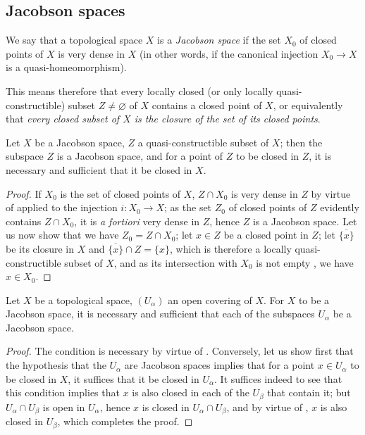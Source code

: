 \subsection{Jacobson spaces}
\label{subsection:IV.10.3}


\begin{definition}[10.3.1]
\label{IV.10.3.1}
We say that a topological space $X$ is a \emph{Jacobson space} if the set $X_0$ of closed points of $X$ is very dense in $X$ (in other words, if the canonical injection $X_0\to X$ is a quasi-homeomorphism).
\end{definition}

This means therefore  that every locally closed (or only locally quasi-constructible) subset $Z\neq\varnothing$ of $X$ contains a closed point of $X$, or equivalently that \emph{every closed subset of $X$ is the closure of the set of its closed points}.

\begin{proposition}[10.3.2]
\label{IV.10.3.2}
Let $X$ be a Jacobson space, $Z$ a quasi-constructible subset of $X$; then the subspace $Z$ is a Jacobson space, and for a point of $Z$ to be closed in $Z$, it is necessary and sufficient that it be closed in $X$.
\end{proposition}

\begin{proof}
If $X_0$ is the set of closed points of $X$, $Z\cap X_0$ is very dense in $Z$ by virtue of  applied to the injection $i:X_0\to X$; as the set $Z_0$ of closed points of $Z$ evidently contains $Z\cap X_0$, it is \emph{a fortiori} very dense in $Z$, hence $Z$ is a Jacobson space.
Let us now show that we have $Z_0=Z\cap X_0$; let $x\in Z$ be a closed point in $Z$; let $\overline{\{x\}}$ be its closure in $X$ and $\overline{\{x\}}\cap Z=\{x\}$, which is therefore a locally quasi-constructible subset of $X$, and as its intersection with $X_0$ is not empty , we have $x\in X_0$.
\end{proof}

\begin{proposition}[10.3.3]
\label{IV.10.3.3}
Let $X$ be a topological space, $(U_\alpha)$ an open covering of $X$.
For $X$ to be a Jacobson space, it is necessary and sufficient that each of the subspaces $U_\alpha$ be a Jacobson space.
\end{proposition}

\begin{proof}
The condition is necessary by virtue of .
Conversely, let us show first that the hypothesis that the $U_\alpha$ are Jacobson spaces implies that for a point $x\in U_\alpha$ to be closed in $X$, it suffices that it be closed in $U_\alpha$.
It suffices indeed to see that this condition implies that $x$ is also closed in each of the $U_\beta$ that contain it; but $U_\alpha\cap U_\beta$ is open in $U_\alpha$, hence $x$ is closed in $U_\alpha\cap U_\beta$, and by virtue of , $x$ is also closed in $U_\beta$, which completes the proof.
\end{proof}

